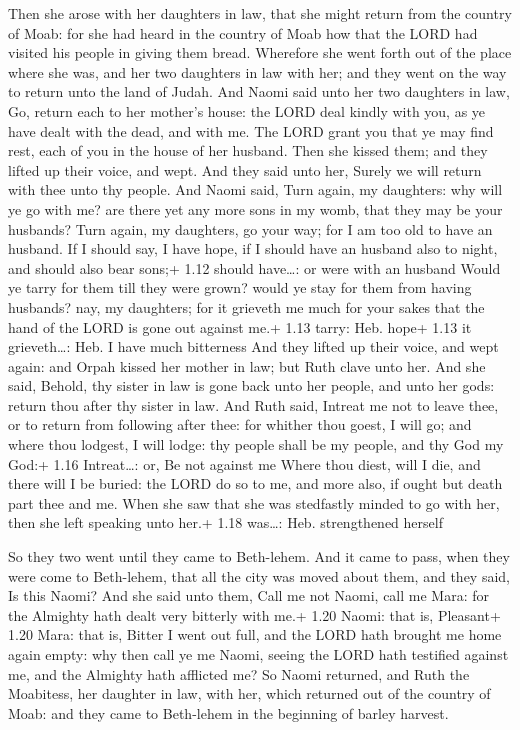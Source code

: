  Then she arose with her daughters in law, that she might
return from the country of Moab: for she had heard in the country of
Moab how that the LORD had visited his people in giving them bread.
 Wherefore she went forth out of the place where she was,
and her two daughters in law with her; and they went on the way to
return unto the land of Judah.  And Naomi said unto her two
daughters in law, Go, return each to her mother's house: the LORD deal
kindly with you, as ye have dealt with the dead, and with me.
 The LORD grant you that ye may find rest, each of you in
the house of her husband. Then she kissed them; and they lifted up their
voice, and wept.  And they said unto her, Surely we will
return with thee unto thy people.  And Naomi said, Turn
again, my daughters: why will ye go with me? are there yet any more sons
in my womb, that they may be your husbands?  Turn again, my
daughters, go your way; for I am too old to have an husband. If I should
say, I have hope, if I should have an husband also to night, and should
also bear sons;+ 1.12 should have\ldots: or were with an husband
 Would ye tarry for them till they were grown? would ye
stay for them from having husbands? nay, my daughters; for it grieveth
me much for your sakes that the hand of the LORD is gone out against
me.+ 1.13 tarry: Heb. hope+ 1.13 it grieveth\ldots: Heb. I have much
bitterness  And they lifted up their voice, and wept again:
and Orpah kissed her mother in law; but Ruth clave unto her.
 And she said, Behold, thy sister in law is gone back unto
her people, and unto her gods: return thou after thy sister in law.
 And Ruth said, Intreat me not to leave thee, or to return
from following after thee: for whither thou goest, I will go; and where
thou lodgest, I will lodge: thy people shall be my people, and thy God
my God:+ 1.16 Intreat\ldots: or, Be not against me  Where
thou diest, will I die, and there will I be buried: the LORD do so to
me, and more also, if ought but death part thee and me. 
When she saw that she was stedfastly minded to go with her, then she
left speaking unto her.+ 1.18 was\ldots: Heb. strengthened herself

 So they two went until they came to Beth-lehem. And it
came to pass, when they were come to Beth-lehem, that all the city was
moved about them, and they said, Is this Naomi?  And she
said unto them, Call me not Naomi, call me Mara: for the Almighty hath
dealt very bitterly with me.+ 1.20 Naomi: that is, Pleasant+ 1.20 Mara:
that is, Bitter  I went out full, and the LORD hath brought
me home again empty: why then call ye me Naomi, seeing the LORD hath
testified against me, and the Almighty hath afflicted me? 
So Naomi returned, and Ruth the Moabitess, her daughter in law, with
her, which returned out of the country of Moab: and they came to
Beth-lehem in the beginning of barley harvest.

